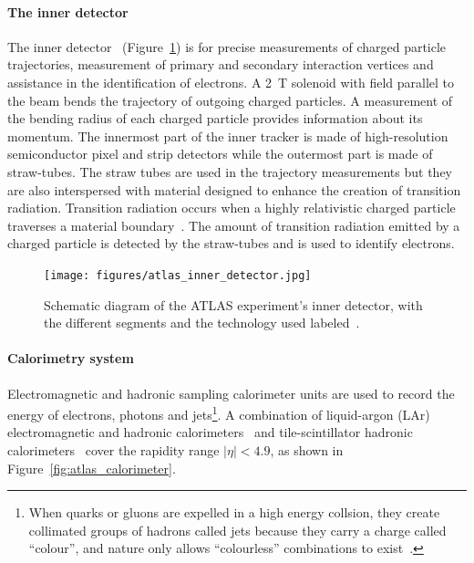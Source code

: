 \paragraph*{The inner detector} \hfill \break
The inner detector~\cite{atlas_inner_detector_tdr_1, atlas_inner_detector_tdr_2} (Figure~\ref{fig:atlas_inner_detector}) is for precise measurements of charged particle trajectories, measurement of primary and secondary interaction vertices and assistance in the identification of electrons. A \SI{2}{\tesla} solenoid with field parallel to the beam bends the trajectory of outgoing charged particles. A measurement of the bending radius of each charged particle provides information about its momentum. The innermost part of the inner tracker is made of high-resolution semiconductor pixel and strip detectors while the outermost part is made of straw-tubes. The straw tubes are used in the trajectory measurements but they are also interspersed with material designed to enhance the creation of transition radiation. Transition radiation occurs when a highly relativistic charged particle traverses a material boundary~\cite{grupen_particle_2008}. The amount of transition radiation emitted by a charged particle is detected by the straw-tubes and is used to identify electrons. 

\begin{figure}[h]
    \centering
    \texttt{[image: figures/atlas\_inner\_detector.jpg]}
    \caption{Schematic diagram of the ATLAS experiment's inner detector, with the different segments and the technology used labeled~\cite{collaboration_atlas_2008}.}
    \label{fig:atlas_inner_detector}
\end{figure}

\paragraph*{Calorimetry system} \hfill \break
Electromagnetic and hadronic sampling calorimeter units are used to record the energy of electrons, photons and jets\footnote{When quarks or gluons are expelled in a high energy collsion, they create collimated groups of hadrons called jets because they carry a charge called ``colour'', and nature only allows ``colourless'' combinations to exist~\cite{grupen_particle_2008}.}. A combination of liquid-argon (LAr) electromagnetic and hadronic calorimeters~\cite{atlas_lar_cal_tdr} and tile-scintillator hadronic calorimeters~\cite{atlas_tile_cal_tdr} cover the rapidity range $|\eta| < 4.9$, as shown in Figure~\ref{fig:atlas_calorimeter}.

